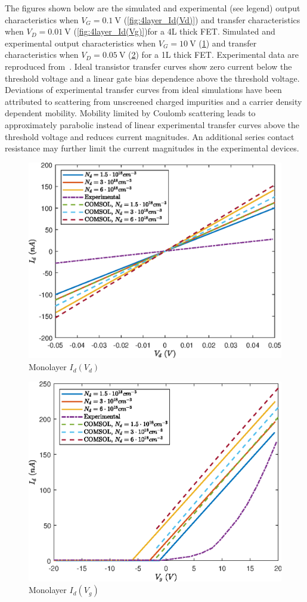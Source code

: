\documentclass[electronics,article,submit,moreauthors,pdftex]{Definitions/mdpi}
\begin{document}
The figures shown below are the simulated and experimental (see legend) output characteristics when $V_G = \SI{0.1}{\volt}$ (\ref{fig:4layer_Id(Vd)}) and transfer characteristics when $V_D = \SI{0.01}{\volt}$ (\ref{fig:4layer_Id(Vg)})for a 4L thick FET. Simulated and experimental output characteristics when $V_G = \SI{10}{\volt}$ (\ref{fig:monolayer_Id(Vd)}) and transfer characteristics when $V_D = \SI{0.05}{\volt}$ (\ref{fig:monolayer_Id(Vg)}) for a 1L thick FET. Experimental data are reproduced from~\cite{Wu:Ultrathin_MoS2}. Ideal transistor transfer curves show zero current below the threshold voltage and a linear gate bias dependence above the threshold voltage. Deviations of experimental transfer curves from ideal simulations have been attributed to scattering from unscreened charged impurities and a carrier density dependent mobility. Mobility limited by Coulomb scattering leads to approximately parabolic instead of linear experimental transfer curves above the threshold voltage and reduces current magnitudes. An additional series contact resistance may further limit the current magnitudes in the experimental devices.

\begin{figure}[H]
	\centering
	\includegraphics[width=.8\textwidth]{Grafici/monolayer_Id(Vd).eps} 
	\caption{Monolayer $I_d(V_d)$}
	\label{fig:monolayer_Id(Vd)}
\end{figure}

\begin{figure}[H]
	\centering
	\includegraphics[width=.8\textwidth]{Grafici/monolayer_Id(Vg).eps} 
	\caption{Monolayer $I_d(V_g)$}
	\label{fig:monolayer_Id(Vg)}
\end{figure}
\end{document}
